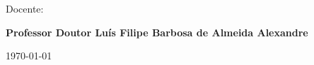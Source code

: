 \vspace{0,5cm}
\begin{center}
\begin{normalsize}
\begin{large}
Docente:
\end{large}
\end{normalsize}
\end{center}

\vspace{0.2cm}
\begin{center}
\begin{large}
\textbf{Professor Doutor Luís Filipe Barbosa de Almeida Alexandre}
\end{large}
\end{center}



\vspace{0.5cm}
\begin{center}
\begin{normalsize}
\today
\end{normalsize}
\end{center}
